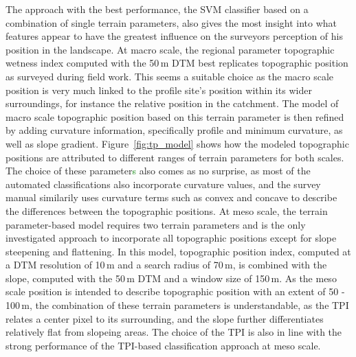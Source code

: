 \documentclass[preprint,12pt,authoryear]{elsarticle}
\begin{document}
The approach with the best performance, the SVM classifier based on a combination of single terrain parameters, also gives the most insight into what features appear to have the greatest influence on the surveyors perception of his position in the landscape. At macro scale, the regional parameter topographic wetness index computed with the 50\,m DTM best replicates topographic position as surveyed during field work. This seems a suitable choice as the macro scale position is very much linked to the profile site's position within its wider surroundings, for instance the relative position in the catchment. The model of macro scale topographic position based on this terrain parameter is then refined by adding curvature information, specifically profile and minimum curvature, as well as slope gradient. Figure~\ref{fig:tp_model} shows how the modeled topographic positions are attributed to different ranges of terrain parameters for both scales. The choice of these parameter\textcolor{green}{s} also comes as no surprise, as most of the automated classifications also incorporate curvature values, and the survey manual similarily uses curvature terms such as convex and concave to describe the differences between the topographic positions. At meso scale, the terrain parameter-based model requires two terrain parameters and is the only investigated approach to incorporate all topographic positions except for slope steepening and flattening. In this model, topographic position index, computed at a DTM resolution of 10\,m and a search radius of 70\,m, is combined with the slope, computed with the 50\,m DTM and a window size of 150\,m. As the meso scale position is intended to describe topographic position with an extent of 50 - 100\,m, the combination of these terrain parameters is understandable, as the TPI relates a center pixel to its surrounding, and the slope further differentiates relatively flat from slopeing areas. The choice of the TPI is also in line with the strong performance of the TPI-based classification approach at meso scale.
\end{document}
